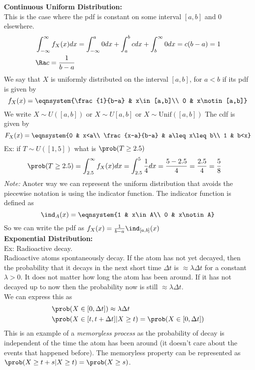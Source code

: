 \textbf{Continuous Uniform Distribution:}\\
This is the case where the pdf is constant on some interval $[a,b]$ and 0 elsewhere.
\begin{align*}
    &\int_{-\infty}^\infty f_X(x)dx=\int_{-\infty}^a 0dx+\int_a^b cdx+\int_b^\infty 0dx=c(b-a)=1\\
    &\Ra c=\frac{1}{b-a}
\end{align*}
We say that $X$ is uniformly distributed on the interval $[a,b]$, for $a<b$ if its pdf is given by
\[f_X(x)=\eqnsystem{\frac{1}{b-a} & x\in[a,b]\\ 0 & x\notin[a,b]}\]
We write $X\sim U([a,b])$ or $X\sim U[a,b]$ or $X\sim\mathrm{Unif}([a,b])$
The cdf is given by
\[F_X(x)=\eqnsystem{0 & x<a\\ \frac{x-a}{b-a} & a\leq x\leq b\\ 1 & b<x}\]
Ex: if $T\sim U([1,5])$ what is $\prob(T\geq 2.5)$
\begin{align*}
    &\prob(T\geq 2.5)=\int_{2.5}^\infty f_X(x)dx=\int_{2.5}^5\frac{1}{4}dx=\frac{5-2.5}{4}=\frac{2.5}{4}=\frac{5}{8}
\end{align*}
\textit{Note:} Anoter way we can represent the uniform distribution that avoids the piecewise notation is using the indicator function. The indicator function is defined as
\[\ind_A(x)=\eqnsystem{1 & x\in A\\ 0 & x\notin A}\]
So we can write the pdf as $f_X(x)=\frac{1}{b-a}\ind_{[a,b]}(x)$\\
\textbf{Exponential Distribution:}\\
Ex: Radioactive decay.\\
Radioactive atoms spontaneously decay. If the atom has not yet decayed, then the probability that it decays in the next short time $\Delta t$ is $\approx \lambda\Delta t$ for a constant $\lambda>0$. It does not matter how long the atom has been around. If it has not decayed up to now then the probability now is still $\approx \lambda \Delta t$.\\
We can express this as
\begin{align*}
    &\prob(X\in[0,\Delta t])\approx\lambda\Delta t\\
    &\prob(X\in[t,t+\Delta t]|X\geq t)=\prob(X\in[0,\Delta t])
\end{align*}
This is an example of a \textit{memoryless process} as the probability of decay is independent of the time the atom has been around (it doesn't care about the events that happened before). The memoryless property can be represented as $\prob(X\geq t+s|X\geq t)=\prob(X\geq s)$.
